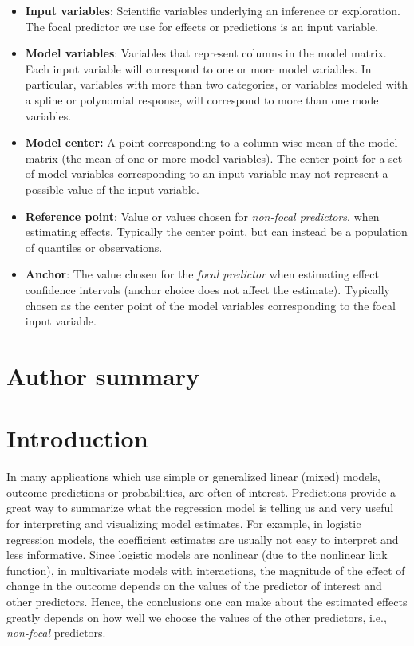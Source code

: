 \documentclass[10pt,letterpaper]{article}
\begin{document}
\begin{itemize}
\item \textbf{Input variables}: Scientific variables underlying an inference or exploration. The focal predictor we use for effects or predictions is an input variable.
\item \textbf{Model variables}: Variables that represent columns in the model matrix. Each input variable will correspond to one or more model variables. In particular, variables with more than two categories, or variables modeled with a spline or polynomial response, will correspond to more than one model variables.
\item\textbf{Model center:} A point corresponding to a column-wise mean of the model matrix (the mean of one or more model variables). The center point for a set of model variables corresponding to an input variable may not represent a possible value of the input variable.
\item \textbf{Reference point}: Value or values chosen for \emph{non-focal predictors}, when estimating effects. Typically the center point, but can instead be a population of quantiles or observations. 
\item \textbf{Anchor}: The value chosen for the \emph{focal predictor} when estimating effect confidence intervals (anchor choice does not affect the estimate). Typically chosen as the center point of the model variables corresponding to the focal input variable.
\end{itemize}

\section*{Author summary}
\linenumbers

\section*{Introduction}

In many applications which use simple or generalized linear (mixed) models, outcome predictions or probabilities, are often of interest. Predictions provide a great way to summarize what the regression model is telling us and very useful for interpreting and visualizing model estimates. For example, in logistic regression models, the coefficient estimates are usually not easy to interpret and less informative. Since logistic models are nonlinear (due to the nonlinear link function), in multivariate models with interactions, the magnitude of the effect of change in the outcome depends on the values of the predictor of interest and other predictors. Hence, the conclusions one can make about the estimated effects greatly depends on how well we choose the values of the other predictors, i.e., \emph{non-focal} predictors.  
\end{document}
